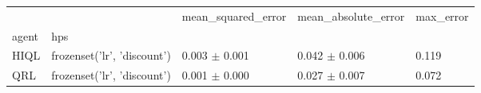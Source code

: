 \begin{tabular}{lllll}
\toprule
 &  & mean_squared_error & mean_absolute_error & max_error \\
agent & hps &  &  &  \\
\midrule
HIQL & frozenset({'lr', 'discount'}) & 0.003 $\pm$ 0.001 & 0.042 $\pm$ 0.006 & 0.119 \\
\cline{1-5}
QRL & frozenset({'lr', 'discount'}) & 0.001 $\pm$ 0.000 & 0.027 $\pm$ 0.007 & 0.072 \\
\cline{1-5}
\bottomrule
\end{tabular}
